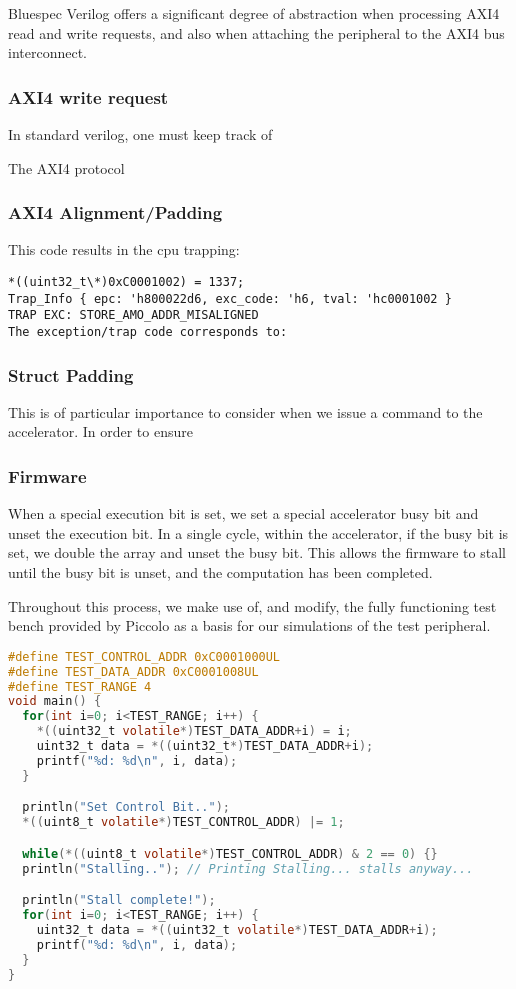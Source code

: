 \documentclass[a4paper,9pt]{report}
\begin{document}
Bluespec Verilog offers a significant degree of abstraction when processing AXI4
read and write requests, and also when attaching the peripheral to the AXI4 bus interconnect.



\subsubsection{AXI4 write request}

In standard verilog, one must keep track of 

The AXI4 protocol 

\subsubsection{AXI4 Alignment/Padding}
This code results in the cpu trapping:
\begin{verbatim}
*((uint32_t\*)0xC0001002) = 1337;
Trap_Info { epc: 'h800022d6, exc_code: 'h6, tval: 'hc0001002 }
TRAP EXC: STORE_AMO_ADDR_MISALIGNED
The exception/trap code corresponds to:
\end{verbatim}

\subsubsection{Struct Padding}
This is of particular importance to consider when we issue a command to the
accelerator. In order to ensure 


\subsubsection{Firmware}
When a special execution bit is set, we set a special accelerator busy bit and
unset the execution bit. In a single cycle, within the accelerator, if the
busy bit is set, we double the array and unset the busy bit. This allows the
firmware to stall until the busy bit is unset, and the computation has been
completed.

Throughout this process, we make use of, and modify, the fully functioning test
bench provided by Piccolo as a basis for our simulations of the test peripheral.

\begin{lstlisting}[language=C,style=customc]
#define TEST_CONTROL_ADDR 0xC0001000UL
#define TEST_DATA_ADDR 0xC0001008UL
#define TEST_RANGE 4
void main() {
  for(int i=0; i<TEST_RANGE; i++) {
    *((uint32_t volatile*)TEST_DATA_ADDR+i) = i;
    uint32_t data = *((uint32_t*)TEST_DATA_ADDR+i);
    printf("%d: %d\n", i, data);
  }

  println("Set Control Bit..");
  *((uint8_t volatile*)TEST_CONTROL_ADDR) |= 1;

  while(*((uint8_t volatile*)TEST_CONTROL_ADDR) & 2 == 0) {}
  println("Stalling.."); // Printing Stalling... stalls anyway...

  println("Stall complete!");
  for(int i=0; i<TEST_RANGE; i++) {
    uint32_t data = *((uint32_t volatile*)TEST_DATA_ADDR+i);
    printf("%d: %d\n", i, data);
  }
}
\end{lstlisting}
\end{document}
